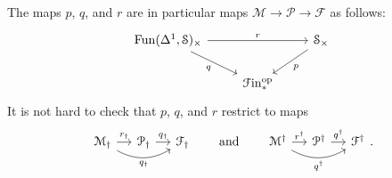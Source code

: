 \documentclass[main.tex]{subfiles}
\begin{document}
The maps $p$, $q$, and $r$ are in particular maps $\mathcal{M} \to \mathcal{P} \to \mathcal{F}$ as follows:
\begin{equation*}
  \begin{tikzcd}
    \Fun(\Delta^{1}, \S)_{\times}
    \arrow[rr, "r"]
    \arrow[dr, swap, "q"]
    && \S_{\times}
    \arrow[dl, "p"]
    \\
    & \Finp\op
  \end{tikzcd}
\end{equation*}
It is not hard to check that $p$, $q$, and $r$ restrict to maps
\begin{equation*}
  \begin{tikzcd}[column sep=small]
    \mathcal{M}_{\dagger}
    \arrow[r, "r_{\dagger}"]
    \arrow[rr, swap,  bend right, "q_{\dagger}"]
    & \mathcal{P}_{\dagger}
    \arrow[r, "q_{\dagger}"]
    & \mathcal{F}_{\dagger}
  \end{tikzcd}
  \qquad\text{and}\qquad
  \begin{tikzcd}[column sep=small]
    \mathcal{M}^{\dagger}
    \arrow[r, "r^{\dagger}"]
    \arrow[rr, swap,  bend right, "q^{\dagger}"]
    & \mathcal{P}^{\dagger}
    \arrow[r, "q^{\dagger}"]
    & \mathcal{F}^{\dagger}
  \end{tikzcd}.
\end{equation*}
\end{document}
